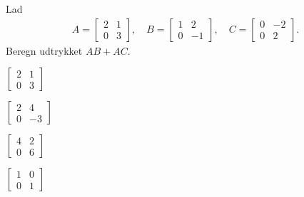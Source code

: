 Lad
\begin{align*}
    A =
\begin{bmatrix}
2 & 1\\
0 & 3
\end{bmatrix},\quad
B =
\begin{bmatrix}
1 & 2\\
0 & -1
\end{bmatrix},\quad
C =
\begin{bmatrix}
0 & -2\\
0 & 2
\end{bmatrix}.
\end{align*}
Beregn udtrykket \(A B + A C\).
\etsvar

\mulighederstart
\svar \(\displaystyle
\begin{bmatrix}
2 & 1\\
0 & 3
\end{bmatrix}\) \korrekt

\svar \(\displaystyle
\begin{bmatrix}
2 & 4\\
0 & -3
\end{bmatrix}\)

\svar \(\displaystyle
\begin{bmatrix}
4 & 2\\
0 & 6
\end{bmatrix}\)

\svar \(\displaystyle
\begin{bmatrix}
1 & 0\\
0 & 1
\end{bmatrix}\)

